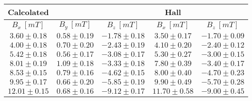 \documentclass{report}
\begin{document}
    \begin{center}
    \begin{tabular}{|c|c|c||c|c|} \hline
    Calcolated & & & Hall &\\ \hline
    $B_x \ [mT]$ & $B_y \ [mT]$ & $B_z \ [mT]$ & $B_x \ [mT]$ & $B_z \ [mT]$ \\ \hline
$ 3.60 \pm 0.18 $ & $ 0.58 \pm 0.19 $ & $ -1.78 \pm 0.18 $ & $ 3.50 \pm 0.17 $ & $ -1.70 \pm 0.09 $ \\ \hline
$ 4.00 \pm 0.18 $ & $ 0.70 \pm 0.20 $ & $ -2.43 \pm 0.19 $ & $ 4.10 \pm 0.20 $ & $ -2.40 \pm 0.12 $ \\ \hline
$ 5.42 \pm 0.18 $ & $ 0.56 \pm 0.17 $ & $ -3.08 \pm 0.17 $ & $ 5.30 \pm 0.27 $ & $ -3.00 \pm 0.15 $ \\ \hline
$ 8.01 \pm 0.19 $ & $ 1.09 \pm 0.18 $ & $ -3.33 \pm 0.18 $ & $ 7.80 \pm 0.39 $ & $ -3.40 \pm 0.17 $ \\ \hline
$ 8.53 \pm 0.15 $ & $ 0.79 \pm 0.16 $ & $ -4.62 \pm 0.15 $ & \cellcolor{red!25}$ 8.00 \pm 0.40 $ & $ -4.70 \pm 0.23 $ \\ \hline
$ 9.95 \pm 0.17 $ & $ 0.66 \pm 0.20 $ & $ -5.85 \pm 0.19 $ & $ 9.90 \pm 0.49 $ & $ -5.70 \pm 0.28 $ \\ \hline
$ 12.01 \pm 0.15 $ & $ 0.68 \pm 0.16 $ & $ -9.12 \pm 0.17 $ & $ 11.70 \pm 0.58 $ & $ -9.00 \pm 0.45 $ \\ \hline
    \end{tabular}
    \end{center}
\end{document}
